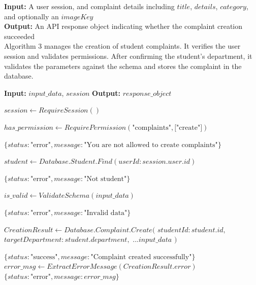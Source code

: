 \textbf{Input:} A user session, and complaint details including $title$, $details$, $category$, and optionally an $imageKey$ \\
\textbf{Output:} An API response object indicating whether the complaint creation succeeded \\

Algorithm 3 manages the creation of student complaints. It verifies the user session and validates permissions. After confirming the student's department, it validates the parameters against the schema and stores the complaint in the database.

\begin{algorithm}[H]
\caption{Student Complaint Creation Process}
\begin{algorithmic}[1]

\State \textbf{Input:} $input\_data$, $session$
\State \textbf{Output:} $response\_object$

    \State {}
    \State $session \gets RequireSession()$

    \State {}
    \State $has\_permission \gets RequirePermission(\text{"complaints"}, \text{["create"]})$

        \State \Return $\{status: \text{"error"}, message: \text{"You are not allowed to create complaints"}\}$
    \EndIf

    \State {}
    \State $student \gets Database.Student.Find(userId: session.user.id)$

        \State \Return $\{status: \text{"error"}, message: \text{"Not student"}\}$
    \EndIf

    \State {}
    \State $is\_valid \gets ValidateSchema(input\_data)$

        \State \Return $\{status: \text{"error"}, message: \text{"Invalid data"}\}$
    \EndIf

    \State {}
    \State $CreationResult \gets Database.Complaint.Create($
    \State \quad $studentId: student.id,$
    \State \quad $targetDepartment: student.department,$
    \State \quad $...input\_data$
    \State $)$

        \State \Return $\{status: \text{"success"}, message: \text{"Complaint created successfully"}\}$
    \Else
        \State {}
        \State $error\_msg \gets ExtractErrorMessage(CreationResult.error)$
        \State \Return $\{status: \text{"error"}, message: error\_msg\}$
    \EndIf

\EndFunction

\end{algorithmic}
\end{algorithm}

